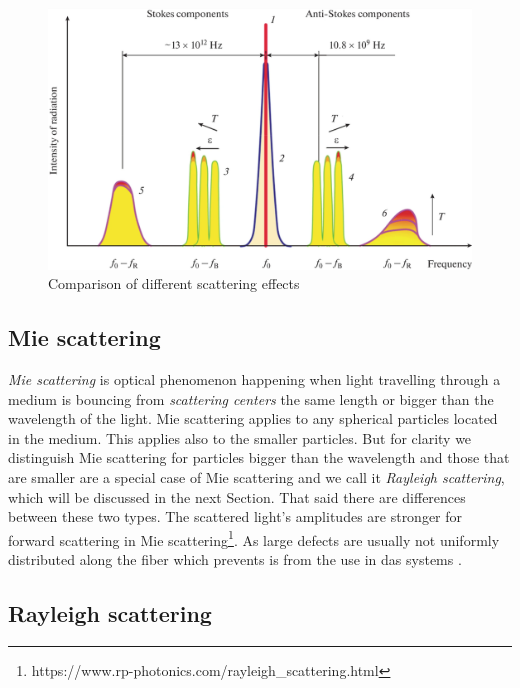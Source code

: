 \begin{figure}
    \centering
    \includegraphics[width=\linewidth]{obrazky/scatterings.png}
    \caption{Comparison of different scattering effects \cite{scattering.comparison}}
    \label{fig:scattering.comparison}
\end{figure}

\subsection{Mie scattering}\label{txt.scattering.mie}

\textit{Mie scattering} is optical phenomenon happening when light travelling through a medium is bouncing from \textit{scattering centers} the same length or bigger than the wavelength of the light. Mie scattering applies to any spherical particles located in the medium. This applies also to the smaller particles. But for clarity we distinguish Mie scattering for particles bigger than the wavelength and those that are smaller are a special case of Mie scattering and we call it \textit{Rayleigh scattering}, which will be discussed in the next Section. That said there are differences between these two types. The scattered light's amplitudes are stronger for forward scattering in Mie scattering\footnote{https://www.rp-photonics.com/rayleigh\_scattering.html}. As large defects are usually not uniformly distributed along the fiber which prevents is from the use in \ac{das} systems \cite{dasKislov}.

\subsection{Rayleigh scattering}\label{txt.scattering.ray}

